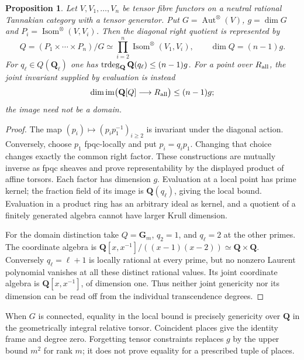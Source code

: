 \documentclass[11pt]{article}
\newtheorem{proposition}[theorem]{Proposition}
\theoremstyle{definition}\newtheorem{definition}[theorem]{Definition}
\theoremstyle{remark}\newtheorem{remark}[theorem]{Remark}
\newcommand{\Q}{\mathbf Q}\newcommand{\Z}{\mathbf Z}
\newcommand{\Gm}{\mathbf G_m}\newcommand{\B}{\mathrm B}\newcommand{\dR}{\mathrm{dR}}
\DeclareMathOperator{\Aut}{Aut}\DeclareMathOperator{\Isom}{Isom}
\begin{document}
\begin{proposition}\label{prop:relative-frames}
Let $V,V_1,\ldots,V_n$ be tensor fibre functors on a neutral rational Tannakian category with a tensor generator. Put $G=\Aut^\otimes(V)$, $g=\dim G$ and $P_i=\Isom^\otimes(V,V_i)$. Then the diagonal right quotient is represented by
\[
 Q=(P_1\times\cdots\times P_n)/G
   \simeq\prod_{i=2}^n\Isom^\otimes(V_1,V_i),
 \qquad \dim Q=(n-1)g.
\]
For $q_\ell\in Q(\Q_\ell)$ one has
$\trdeg_\Q\Q(q_\ell)\le(n-1)g$. For a point over $R_{\rm all}$, the joint invariant supplied by evaluation is instead
\[
 \dim\im\bigl(\Q[Q]\longrightarrow R_{\rm all}\bigr)\le(n-1)g;
\]
the image need not be a domain.
\end{proposition}
\begin{proof}
The map $(p_i)\mapsto(p_ip_1^{-1})_{i\ge2}$ is invariant under the diagonal action. Conversely, choose $p_1$ fpqc-locally and put $p_i=q_ip_1$. Changing that choice changes exactly the common right factor. These constructions are mutually inverse as fpqc sheaves and prove representability by the displayed product of affine torsors. Each factor has dimension $g$. Evaluation at a local point has prime kernel; the fraction field of its image is $\Q(q_\ell)$, giving the local bound. Evaluation in a product ring has an arbitrary ideal as kernel, and a quotient of a finitely generated algebra cannot have larger Krull dimension.

For the domain distinction take $Q=\Gm$, $q_2=1$, and $q_\ell=2$ at the other primes. The coordinate algebra is $\Q[x,x^{-1}]/((x-1)(x-2))\simeq\Q\times\Q$. Conversely $q_\ell=\ell+1$ is locally rational at every prime, but no nonzero Laurent polynomial vanishes at all these distinct rational values. Its joint coordinate algebra is $\Q[x,x^{-1}]$, of dimension one. Thus neither joint genericity nor its dimension can be read off from the individual transcendence degrees.
\end{proof}

When $G$ is connected, equality in the local bound is precisely genericity over $\Q$ in the geometrically integral relative torsor. Coincident places give the identity frame and degree zero. Forgetting tensor constraints replaces $g$ by the upper bound $m^2$ for rank $m$; it does not prove equality for a prescribed tuple of places.
\end{document}
